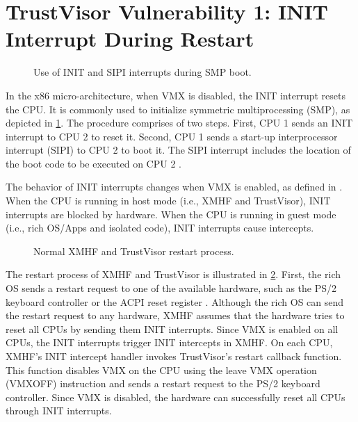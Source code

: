 \section{TrustVisor Vulnerability 1: INIT Interrupt During Restart}
\label{sec:vuln_xmhf_tv_init_twice}

\begin{figure}[tbp]
	\begin{center}
	
	\end{center}
	\caption{Use of INIT and SIPI interrupts during SMP boot.}
	\label{fig:vuln_init_smp}
\end{figure}

In the x86 micro-architecture, when VMX is disabled, the INIT interrupt resets the CPU. It is commonly used to initialize symmetric multiprocessing (SMP), as depicted in \ref{fig:vuln_init_smp}. The procedure comprises of two steps. First, CPU 1 sends an INIT interrupt to CPU 2 to reset it. Second, CPU 1 sends a start-up interprocessor interrupt (SIPI) to CPU 2 to boot it. The SIPI interrupt includes the location of the boot code to be executed on CPU 2 \cite{intel_sdm}.

The behavior of INIT interrupts changes when VMX is enabled, as defined in \cite{intel_sdm}. When the CPU is running in host mode (i.e., XMHF and TrustVisor), INIT interrupts are blocked by hardware. When the CPU is running in guest mode (i.e., rich OS/Apps and isolated code), INIT interrupts cause intercepts.

\begin{figure}[tbp]
	\begin{center}
	
	\end{center}
	\caption{Normal XMHF and TrustVisor restart process.}
	\label{fig:vuln_init_reset}
\end{figure}

The restart process of XMHF and TrustVisor is illustrated in \ref{fig:vuln_init_reset}. First, the rich OS sends a restart request to one of the available hardware, such as the PS/2 keyboard controller or the ACPI reset register \cite{acpi_spec}. Although the rich OS can send the restart request to any hardware, XMHF assumes that the hardware tries to reset all CPUs by sending them INIT interrupts. Since VMX is enabled on all CPUs, the INIT interrupts trigger INIT intercepts in XMHF. On each CPU, XMHF's INIT intercept handler invokes TrustVisor's restart callback function. This function disables VMX on the CPU using the leave VMX operation (VMXOFF) instruction and sends a restart request to the PS/2 keyboard controller. Since VMX is disabled, the hardware can successfully reset all CPUs through INIT interrupts.

